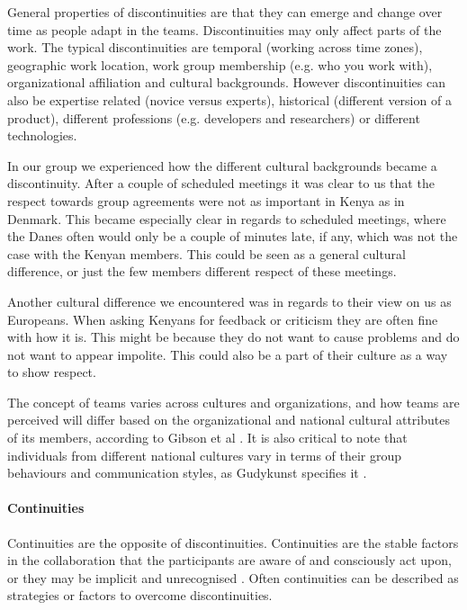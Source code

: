 General properties of discontinuities are that they can emerge and change over time as people adapt in the teams. Discontinuities may only affect parts of the work. The typical discontinuities are temporal (working across time zones), geographic work location, work group membership (e.g. who you work with), organizational affiliation and cultural backgrounds. However discontinuities can also be expertise related (novice versus experts), historical (different version of a product), different professions (e.g. developers and researchers) or different technologies.


In our group we experienced how the different cultural backgrounds became a discontinuity. After a couple of scheduled meetings it was clear to us that the respect towards group agreements were not as important in Kenya as in Denmark. This became especially clear in regards to scheduled meetings, where the Danes often would only be a couple of minutes late, if any, which was not the case with the Kenyan members. This could be seen as a general cultural difference, or just the few members different respect of these meetings. 

Another cultural difference we encountered was in regards to their view on us as Europeans. When asking Kenyans for feedback or criticism they are often fine with how it is. This might be because they do not want to cause problems and do not want to appear impolite. This could also be a part of their culture as a way to show respect.

The concept of teams varies across cultures and organizations, and how teams are perceived will differ based on the organizational and national cultural attributes of its members, according to Gibson et al \cite{gibson2001metaphors}. It is also critical to note that individuals from different national cultures vary in terms of their group behaviours and communication styles, as Gudykunst specifies it \cite{gudykunst1997cultural}.

\paragraph{Continuities} \label{par:continuities}
Continuities are the opposite of discontinuities. Continuities are the stable factors in the collaboration that the participants are aware of and consciously act upon, or they may be implicit and unrecognised \cite{watson2007distance}. Often continuities can be described as strategies or factors to overcome discontinuities.